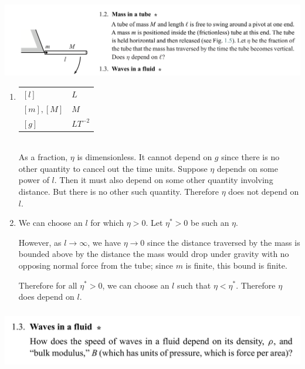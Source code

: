 \subsubsection*{}
\begin{mdframed}
  \includegraphics[width=400pt]{img/physics--classical-mechanics--morin--1-2.png}
\end{mdframed}

\begin{enumerate}
\item
  \begin{tabular}{l|l}
    $[l]$       & $L$ \\
    $[m], [M]$  & $M$ \\
    $[g]$       & $LT^{-2}$
  \end{tabular}\\
  As a fraction, $\eta$ is dimensionless. It cannot depend on $g$ since there is no other
  quantity to cancel out the time units. Suppose $\eta$ depends on some power of $l$. Then it must
  also depend on some other quantity involving distance. But there is no other
  such quantity. Therefore $\eta$ does not depend on $l$.  \checkmark

\item {} We can choose an $l$ for which $\eta > 0$. Let $\eta^* > 0$ be such
  an $\eta$.

  However, as $l \to \infty$, we have $\eta \to 0$ since the distance traversed by the mass is bounded
  above by the distance the mass would drop under gravity with no opposing normal force from the tube;
  since $m$ is finite, this bound is finite.

  Therefore for all $\eta^* > 0$, we can choose an $l$ such that $\eta < \eta^*$. Therefore $\eta$
  does depend on $l$.
\end{enumerate}

\subsubsection*{}
\begin{mdframed}
  \includegraphics[width=400pt]{img/physics--classical-mechanics--morin--1-3.png}
\end{mdframed}


